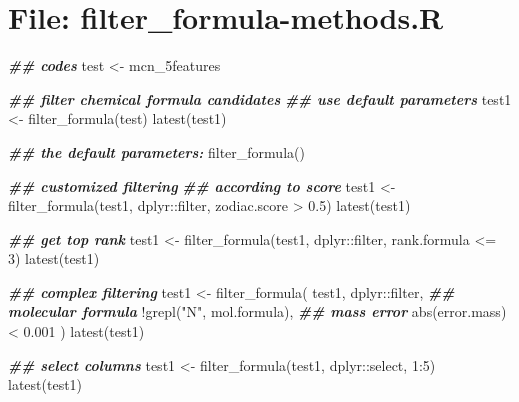 \documentclass[
]{article}
\newenvironment{Shaded}{\begin{snugshade}}{\end{snugshade}}
\newcommand{\DecValTok}[1]{\textcolor[rgb]{0.00,0.00,0.81}{#1}}
\newcommand{\DocumentationTok}[1]{\textcolor[rgb]{0.56,0.35,0.01}{\textbf{\textit{#1}}}}
\newcommand{\FloatTok}[1]{\textcolor[rgb]{0.00,0.00,0.81}{#1}}
\newcommand{\FunctionTok}[1]{\textcolor[rgb]{0.00,0.00,0.00}{#1}}
\newcommand{\NormalTok}[1]{#1}
\newcommand{\OtherTok}[1]{\textcolor[rgb]{0.56,0.35,0.01}{#1}}
\newcommand{\SpecialCharTok}[1]{\textcolor[rgb]{0.00,0.00,0.00}{#1}}
\newcommand{\StringTok}[1]{\textcolor[rgb]{0.31,0.60,0.02}{#1}}
\begin{document}
\hypertarget{file-filter_formula-methods.r}{%
\section{File: filter\_formula-methods.R}\label{file-filter_formula-methods.r}}

\begin{Shaded}
\begin{Highlighting}[]
\DocumentationTok{\#\# codes}
\NormalTok{test }\OtherTok{\textless{}{-}}\NormalTok{ mcn\_5features}

\DocumentationTok{\#\# filter chemical formula candidates}
\DocumentationTok{\#\# use default parameters}
\NormalTok{test1 }\OtherTok{\textless{}{-}} \FunctionTok{filter\_formula}\NormalTok{(test)}
\FunctionTok{latest}\NormalTok{(test1)}

\DocumentationTok{\#\# the default parameters:}
\FunctionTok{filter\_formula}\NormalTok{()}

\DocumentationTok{\#\# customized filtering}
\DocumentationTok{\#\# according to score}
\NormalTok{test1 }\OtherTok{\textless{}{-}} \FunctionTok{filter\_formula}\NormalTok{(test1, dplyr}\SpecialCharTok{::}\NormalTok{filter, zodiac.score }\SpecialCharTok{\textgreater{}} \FloatTok{0.5}\NormalTok{)}
\FunctionTok{latest}\NormalTok{(test1)}

\DocumentationTok{\#\# get top rank}
\NormalTok{test1 }\OtherTok{\textless{}{-}} \FunctionTok{filter\_formula}\NormalTok{(test1, dplyr}\SpecialCharTok{::}\NormalTok{filter, rank.formula }\SpecialCharTok{\textless{}=} \DecValTok{3}\NormalTok{)}
\FunctionTok{latest}\NormalTok{(test1)}

\DocumentationTok{\#\# complex filtering}
\NormalTok{test1 }\OtherTok{\textless{}{-}} \FunctionTok{filter\_formula}\NormalTok{(}
\NormalTok{  test1, dplyr}\SpecialCharTok{::}\NormalTok{filter,}
  \DocumentationTok{\#\# molecular formula}
  \SpecialCharTok{!}\FunctionTok{grepl}\NormalTok{(}\StringTok{"N"}\NormalTok{, mol.formula),}
  \DocumentationTok{\#\# mass error}
  \FunctionTok{abs}\NormalTok{(error.mass) }\SpecialCharTok{\textless{}} \FloatTok{0.001}
\NormalTok{)}
\FunctionTok{latest}\NormalTok{(test1)}

\DocumentationTok{\#\# select columns}
\NormalTok{test1 }\OtherTok{\textless{}{-}} \FunctionTok{filter\_formula}\NormalTok{(test1, dplyr}\SpecialCharTok{::}\NormalTok{select, }\DecValTok{1}\SpecialCharTok{:}\DecValTok{5}\NormalTok{)}
\FunctionTok{latest}\NormalTok{(test1)}
\end{Highlighting}
\end{Shaded}
\end{document}
